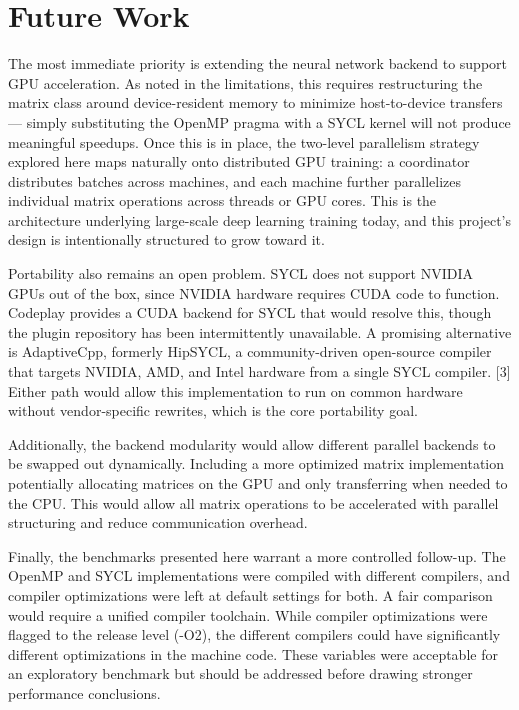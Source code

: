 \documentclass[journal]{IEEEtran}
\begin{document}
\section{Future Work}
\par The most immediate priority is extending the neural network backend 
to support GPU acceleration. As noted in the limitations, this requires 
restructuring the matrix class around device-resident memory to minimize 
host-to-device transfers — simply substituting the OpenMP pragma with a 
SYCL kernel will not produce meaningful speedups. Once this is in place, 
the two-level parallelism strategy explored here maps naturally onto 
distributed GPU training: a coordinator distributes batches across 
machines, and each machine further parallelizes individual matrix 
operations across threads or GPU cores. This is the architecture 
underlying large-scale deep learning training today, and this project's 
design is intentionally structured to grow toward it.
\par Portability also remains an open problem. SYCL does not support 
NVIDIA GPUs out of the box, since NVIDIA hardware requires CUDA code to 
function. Codeplay provides a CUDA backend for SYCL that would resolve 
this, though the plugin repository has been intermittently unavailable. 
A promising alternative is AdaptiveCpp, formerly HipSYCL, a 
community-driven open-source compiler that targets NVIDIA, AMD, and Intel 
hardware from a single SYCL compiler. [3] Either path would allow this 
implementation to run on common hardware without vendor-specific 
rewrites, which is the core portability goal.
\par Additionally, the backend modularity would allow different parallel backends to be swapped out dynamically. Including a more optimized matrix implementation potentially allocating matrices on the GPU and only transferring when needed to the CPU. This would allow all matrix operations to be accelerated with parallel structuring and reduce communication overhead. 
\par Finally, the benchmarks presented here warrant a more controlled 
follow-up. The OpenMP and SYCL implementations were compiled with 
different compilers, and compiler optimizations were left at default 
settings for both. A fair comparison would require a unified 
compiler toolchain. While compiler optimizations were flagged to the release level (-O2), the different compilers could have significantly different optimizations in the machine code. These variables were acceptable for an exploratory benchmark but should be addressed before drawing stronger performance conclusions.
\end{document}

